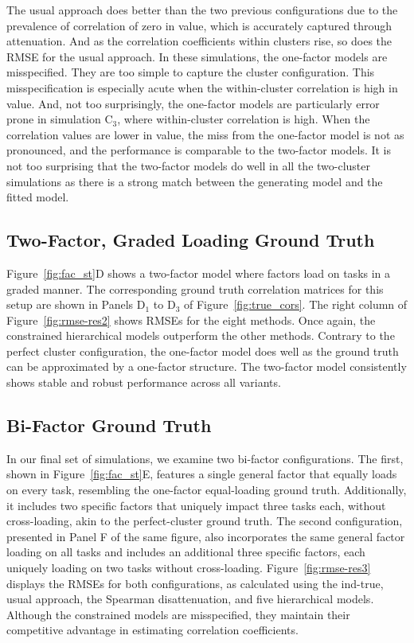 \documentclass[man, 12pt]{apa7} %
\begin{document}
The usual approach does better than the two previous configurations due to the prevalence of correlation of zero in value, which is accurately captured through attenuation.  And as the correlation coefficients within clusters rise, so does the RMSE for the usual approach.   In these simulations, the one-factor models are misspecified.  They are too simple to capture the cluster configuration.  This misspecification is especially acute when the within-cluster correlation is high in value.  And, not too surprisingly, the one-factor models are particularly error prone in simulation C$_3$, where within-cluster correlation is high.   When the correlation values are lower in value, the miss from the one-factor model is not as pronounced, and the performance is comparable to the two-factor models.  It is not too surprising that the two-factor models do well in all the two-cluster simulations as there is a strong match between the generating model and the fitted model.


\subsection{Two-Factor, Graded Loading Ground Truth}

Figure~\ref{fig:fac_st}D shows a two-factor model where factors load on tasks in a graded manner. The corresponding ground truth correlation matrices for this setup are shown in Panels D$_1$ to D$_3$ of Figure~\ref{fig:true_cors}. The right column of Figure~\ref{fig:rmse-res2} shows RMSEs for the eight methods.   Once again, the constrained hierarchical models outperform the other methods.  Contrary to the perfect cluster configuration, the one-factor model does well as the ground truth can be approximated by a one-factor structure. The two-factor model consistently shows stable and robust performance across all variants.

\subsection{Bi-Factor Ground Truth}


In our final set of simulations, we examine two bi-factor configurations. The first, shown in Figure~\ref{fig:fac_st}E, features a single general factor that equally loads on every task, resembling the one-factor equal-loading ground truth. Additionally, it includes two specific factors that uniquely impact three tasks each, without cross-loading, akin to the perfect-cluster ground truth. The second configuration, presented in Panel F of the same figure, also incorporates the same general factor loading on all tasks and includes an additional three specific factors, each uniquely loading on two tasks without cross-loading. Figure~\ref{fig:rmse-res3} displays the RMSEs for both configurations, as calculated using the ind-true, usual approach, the Spearman disattenuation, and five hierarchical models. Although the constrained models are misspecified, they maintain their competitive advantage in estimating correlation coefficients. 
\end{document}
